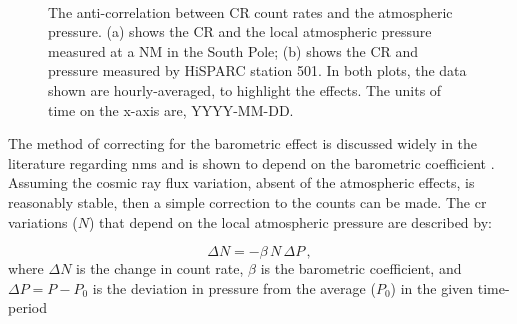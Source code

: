 \begin{figure}[ht!]
	\centering
	 \\
	
	\caption{The anti-correlation between CR count rates and the atmospheric pressure. (a) shows the CR and the local atmospheric pressure measured at a NM in the South Pole; (b) shows the CR and pressure measured by HiSPARC station 501. In both plots, the data shown are hourly-averaged, to highlight the effects. The units of time on the x-axis are, YYYY-MM-DD.}
	\label{fig:CR_V_P}
\end{figure}


The method of correcting for the barometric effect is discussed widely in the literature regarding \glspl{nm} and is shown to depend on the barometric coefficient \citep{paschalis_online_2013}. Assuming the cosmic ray flux variation, absent of the atmospheric effects, is reasonably stable, then a simple correction to the counts can be made. The \gls{cr} variations ($N$) that depend on the local atmospheric pressure are described by:

\begin{equation}
\Delta N = - \beta \, N \, \Delta P \, ,
\label{eq:presscorr1}
\end{equation}
%
where $\Delta N$ is the change in count rate, $\beta$ is the barometric coefficient, and $\Delta P = P - P_0$ is the deviation in pressure from the average ($P_0$) in the given time-period \citep{paschalis_online_2013}

